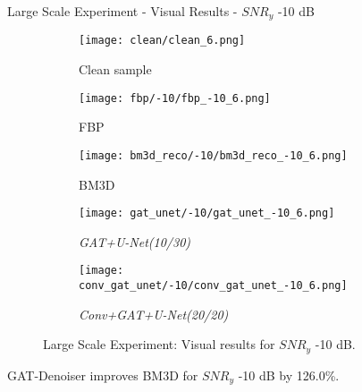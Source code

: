 \begin{frame}{Large Scale Experiment - Visual Results - $SNR_y$ -10 dB}
    \begin{figure}
        \captionsetup[subfigure]{justification=centering}
        \centering
        \begin{subfigure}[t]{0.18\textwidth}
          \texttt{[image: clean/clean\_6.png]}
          \caption{Clean sample}
        \end{subfigure} \hfill
        \begin{subfigure}[t]{0.18\textwidth}
          \texttt{[image: fbp/-10/fbp\_-10\_6.png]}
          \caption{FBP}
        \end{subfigure} \hfill
        \begin{subfigure}[t]{0.18\textwidth}
          \texttt{[image: bm3d\_reco/-10/bm3d\_reco\_-10\_6.png]}
          \caption{BM3D}
        \end{subfigure} \hfill
        \begin{subfigure}[t]{0.18\textwidth}
          \texttt{[image: gat\_unet/-10/gat\_unet\_-10\_6.png]}
          \caption{\textit{GAT+U-Net(10/30)}}
        \end{subfigure} \hfill
        \begin{subfigure}[t]{0.18\textwidth}
          \texttt{[image: conv\_gat\_unet/-10/conv\_gat\_unet\_-10\_6.png]}
          \caption{\textit{Conv+GAT+U-Net(20/20)}}
        \end{subfigure} \hfill
        \caption{Large Scale Experiment: Visual results for $SNR_y$ -10 dB.}
      \end{figure}
      
    
      \begin{tcolorbox}[colback=red!5!white, colframe=red!75!black]
        GAT-Denoiser improves BM3D for $SNR_y$ -10 dB by 126.0\%.
        \end{tcolorbox}
        
\end{frame}

